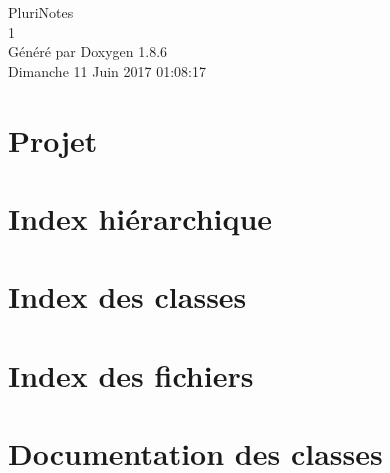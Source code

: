 \documentclass[twoside]{book}
\newcommand{\clearemptydoublepage}{%
  \newpage{\pagestyle{empty}\cleardoublepage}%
}
\begin{document}
\hypersetup{pageanchor=false}
\begin{titlepage}
\vspace*{7cm}
\begin{center}%
{\Large Pluri\-Notes \\[1ex]\large 1 }\\
\vspace*{1cm}
{\large Généré par Doxygen 1.8.6}\\
\vspace*{0.5cm}
{\small Dimanche 11 Juin 2017 01:08:17}\\
\end{center}
\end{titlepage}
\clearemptydoublepage
\tableofcontents
\clearemptydoublepage
{}
\hypersetup{pageanchor=true}

\chapter{Projet}
\label{md__home_camille__documents__u_t_c__h_u04__l_o21__projet__projet__r_e_a_d_m_e}
\hypertarget{md__home_camille__documents__u_t_c__h_u04__l_o21__projet__projet__r_e_a_d_m_e}{}

\chapter{Index hiérarchique}

\chapter{Index des classes}

\chapter{Index des fichiers}

\chapter{Documentation des classes}























\end{document}
